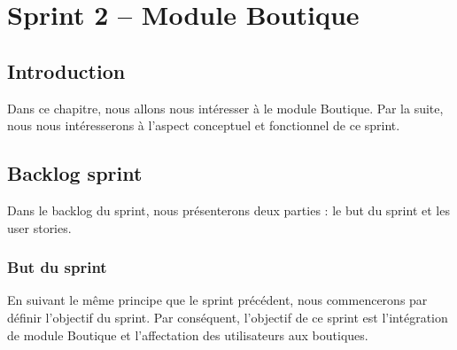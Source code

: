 \chapter{Sprint 2 – Module Boutique}
	
\section*{Introduction}
Dans ce chapitre, nous allons nous intéresser à le module Boutique. Par la suite, nous nous intéresserons à l’aspect conceptuel et fonctionnel de ce sprint.

\section[Backlog sprint]{Backlog sprint}
Dans le backlog du sprint, nous présenterons deux parties : le but du sprint et les user stories.

\subsection[But du sprint]{But du sprint}
En suivant le même principe que le sprint précédent, nous commencerons par définir l'objectif du sprint. Par conséquent, l'objectif de ce sprint est l'intégration de module Boutique et l’affectation des utilisateurs aux boutiques.
